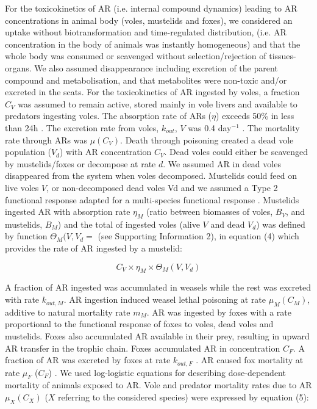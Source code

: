\documentclass[11pt]{article}
\begin{document}
For the toxicokinetics of AR (i.e. internal compound dynamics) leading to AR concentrations in animal body (voles, mustelids and foxes), we considered an uptake without biotransformation and time-regulated distribution, (i.e. AR concentration in the body of animals was instantly homogeneous) and that the whole body was consumed or scavenged without selection/rejection of tissues-organs. We also assumed disappearance including excretion of the parent compound and metabolisation, and that metabolites were non-toxic and/or excreted in the scats. 
For the toxicokinetics of AR ingested by voles, a fraction $C_V$ was assumed to remain active, stored mainly in vole livers and available to predators ingesting voles. The absorption rate of ARs ($\eta$) exceeds 50\% in less than 24h \citep{Jacquot2013}. The excretion rate from voles, $k_{out}$, $V$ was 0.4 day$^{-1}$ \citep{Sage2008}. The mortality rate through ARs was $\mu(C_V)$. Death through poisoning created a dead vole population ($V_d$) with AR concentration $C_V$. Dead voles could either be scavenged by mustelids/foxes or decompose at rate $d$. We assumed AR in dead voles disappeared from the system when voles decomposed. 
Mustelids could feed on live voles $V$, or non-decomposed dead voles Vd and we assumed a Type 2 functional response adapted for a multi-species functional response \citep{Baudrot2016}. Mustelids ingested AR with absorption rate $\eta_M$ (ratio between biomasses of voles, $B_V$, and mustelids, $B_M$) and the total of ingested voles (alive $V$ and dead $V_d$) was defined by function $\Theta_M (V,V_d=$ (see Supporting Information 2), in equation (4) which provides the rate of AR ingested by a mustelid:

\begin{equation}
C_V \times \eta_M \times \Theta_M(V,V_d)
\end{equation}

A fraction of AR ingested was accumulated in weasels while the rest was excreted with rate $k_{out,M}$. AR ingestion induced weasel lethal poisoning at rate $\mu_M(C_M)$, additive to natural mortality rate $m_M$.
AR was ingested by foxes with a rate proportional to the functional response of foxes to voles, dead voles and mustelids. Foxes also accumulated AR available in their prey, resulting in upward AR transfer in the trophic chain. Foxes accumulated AR in concentration $C_F$. A fraction of AR was excreted by foxes at rate $k_{out,F}$ \citep{Sage2008}. AR caused fox mortality at rate $\mu_F$ ($C_F$) \citep{Sage2010}.
We used log-logistic equations for describing dose-dependent mortality of animals exposed to AR. Vole and predator mortality rates due to AR $\mu_X(C_X)$ ($X$ referring to the considered species) were expressed by equation (5):
\end{document}
